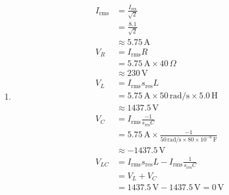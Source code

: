 \documentclass[journal,12pt,twocolumn]{IEEEtran}
\begin{document}
\begin{enumerate}
\item 

\begin{align}
    I_{\text{rms}} & = \frac{I_{\text{res}}}{\sqrt{2}} \\
    & = \frac{8.1}{\sqrt{2}} \\
    & \approx 5.75 \, \text{A}\\
    V_R & = I_{\text{rms}}   R \\
    & = 5.75 \, \text{A} \times 40 \, \Omega \\
    & \approx 230 \, \text{V} \\
    V_L & = I_{\text{rms}}   s_{\text{res}} L \\
    & = 5.75 \, \text{A} \times 50 \, \text{rad/s} \times 5.0 \, \text{H} \\
    & \approx 1437.5 \, \text{V}  \\
    V_C & = I_{\text{rms}}   \frac{-1}{s_{\text{res}} C} \\
    & = 5.75 \, \text{A} \times \frac{-1}{50 \, \text{rad/s} \times 80 \times 10^{-6} \, \text{F}} \\
    & \approx -1437.5 \, \text{V} \\
    V_{LC} & = I_{\text{rms}}   s_{\text{res}} L - I_{\text{rms}}   \frac{1}{s_{\text{res}} C} \\
    & = V_L + V_C \\
    & = 1437.5 \, \text{V} - 1437.5 \, \text{V} = 0 \, \text{V}
\end{align}
\end{enumerate}
\end{document}
